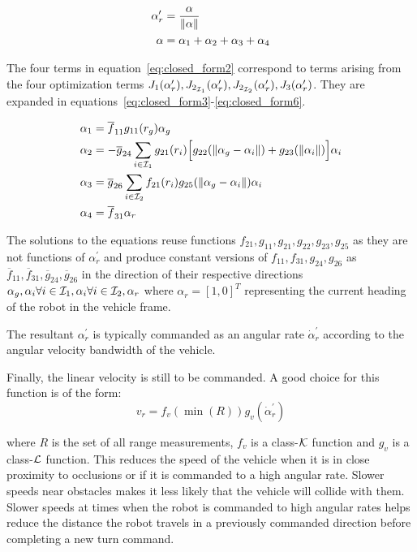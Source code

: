 \begin{align}
	\alpha_r^\prime &= \frac{\alpha}{\left\lVert\alpha\right\rVert} \label{eq:closed_form1} \\
	\alpha &= \alpha_1 + \alpha_2 + \alpha_3 + \alpha_4 \label{eq:closed_form2}
\end{align}

The four terms in equation~\ref{eq:closed_form2} correspond to terms arising from the four optimization terms $J_1(\alpha_r^\prime), J_{2_{{\cal I}_1}}(\alpha_r^\prime), J_{2_{{\cal I}_2}}(\alpha_r^\prime), J_3(\alpha_r^\prime)$.
They are expanded in equations~\ref{eq:closed_form3}-\ref{eq:closed_form6}.

\begin{align}
	\alpha_1 &= \overline f_{11}g_{11}(r_g)\alpha_g \label{eq:closed_form3} \\
	\alpha_2 &= - \overline g_{24} \sum_{i \in {\cal I}_1} g_{21}(r_i)\Big [ g_{22}(\left\lVert\alpha_g - \alpha_i\right\rVert) + g_{23}(\left\lVert\alpha_i\right\rVert) \Big ] \alpha_i
					\label{eq:closed_form4} \\
	\alpha_3 &= \overline g_{26} \sum_{i \in {\cal I}_2} f_{21}(r_i) g_{25}(\left\lVert\alpha_g - \alpha_i\right\rVert)\alpha_i \label{eq:closed_form5} \\
	\alpha_4 &= \overline f_{31} \alpha_r \label{eq:closed_form6}
\end{align}

The solutions to the equations reuse functions $f_{21}, g_{11}, g_{21}, g_{22}, g_{23}, g_{25}$ as they are not functions of $\alpha_r^\prime$ and produce constant versions
of $f_{11}, f_{31}, g_{24}, g_{26}$ as $\overline f_{11}, \overline f_{31}, \overline g_{24}, \overline g_{26}$ in the direction of their respective directions
$\alpha_g, \alpha_i \forall i \in {\cal I}_1, \alpha_i \forall i \in {\cal I}_2, \alpha_r$ where $\alpha_r = [1,0]^T$ representing the current heading of 
the robot in the vehicle frame.

The resultant $\alpha_r^\prime$ is typically commanded as an angular rate $\dot \alpha_r^\prime$ according to the angular velocity bandwidth of the vehicle.

Finally, the linear velocity is still to be commanded. A good choice for this function is of the form:
\begin{equation}
	v_r = f_v(\min(R))g_v(\dot \alpha_r^\prime)
\label{eq:linear_velocity1}
\end{equation}

where $R$ is the set of all range measurements, $f_v$ is a class-${\cal K}$ function and $g_v$ is a class-${\cal L}$ function. 
This reduces the speed of the vehicle when it is in close proximity to occlusions or if it is commanded to a high angular rate.
Slower speeds near obstacles makes it less likely that the vehicle will collide with them. Slower speeds at times when the robot is commanded to
high angular rates helps reduce the distance the robot travels in a previously commanded direction before completing a new 
turn command.

